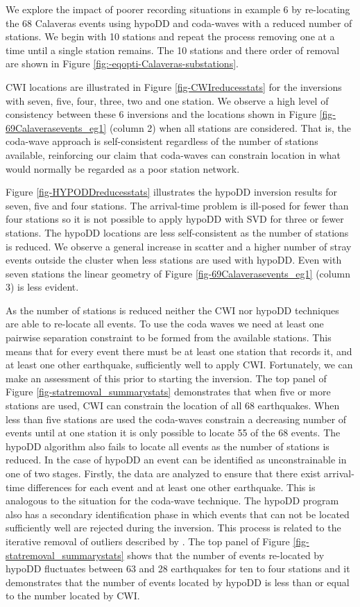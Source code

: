 \documentclass[12pt,double]{article}
\begin{document}
We explore the impact of poorer recording situations in example 6 by
re-locating the 68 Calaveras events  using hypoDD and coda-waves
with a reduced number of stations. We begin with 10 stations and
repeat the process removing one at a time until a single station
remains. The 10 stations and there order of removal are shown in Figure
\ref{fig:-eqopti-Calaveras-substations}.

CWI locations are illustrated in Figure \ref{fig-CWIreducesstats}
for the inversions with seven, five, four, three, two and one
station. We observe a high level of consistency between these 6
inversions and the locations shown in Figure
\ref{fig-69Calaverasevents_eg1} (column 2) when all stations are
considered. That is, the coda-wave approach is self-consistent
regardless of the number of stations available, reinforcing our
claim that coda-waves can constrain location in what would
normally be regarded as a poor station network.


Figure \ref{fig-HYPODDreducesstats} illustrates the hypoDD inversion
results for seven, five and four stations. The arrival-time problem
is ill-posed for fewer than four stations so it is not possible to
apply hypoDD with SVD for three or fewer stations.  The hypoDD
locations are less self-consistent as the number of stations is
reduced. We observe a general increase in scatter and a higher
number of stray events outside the cluster when less stations are
used with hypoDD. Even with seven stations the linear geometry of
Figure \ref{fig-69Calaverasevents_eg1} (column 3) is less evident.


As the number of stations is reduced neither the CWI nor hypoDD
techniques are able to re-locate all events. To use the coda
waves we need at least one pairwise separation constraint to be
formed from the available stations. This means that for every event
there must be at least one station that records it, and at least one
other earthquake, sufficiently well to apply CWI. Fortunately, we can
make an assessment of this prior to starting the inversion. The top
panel of Figure \ref{fig-statremoval_summarystats} demonstrates that
when five or more stations are used, CWI can constrain the location
of all 68 earthquakes. When less than five stations are used the
coda-waves constrain a decreasing number of events until at one
station it is only possible to locate 55 of the 68 events. The
hypoDD algorithm also fails to locate all events as the number of
stations is reduced. In the case of hypoDD an event can be
identified as unconstrainable in one of two stages. Firstly, the
data are analyzed to ensure that there exist arrival-time
differences for each event and at least one other earthquake. This
is analogous to the situation for the coda-wave technique. The
hypoDD program also has a secondary identification phase in which
events that can not be located sufficiently well are rejected during the
inversion. This process is related to the iterative removal of
outliers described by \citet{dr_Waldhauser00a}. The top panel of
Figure \ref{fig-statremoval_summarystats} shows that the number of
events re-located by hypoDD fluctuates between 63 and 28 earthquakes
for ten to four stations and it demonstrates that the number of
events located by hypoDD is less than or equal to the number located
by CWI.
\end{document}
